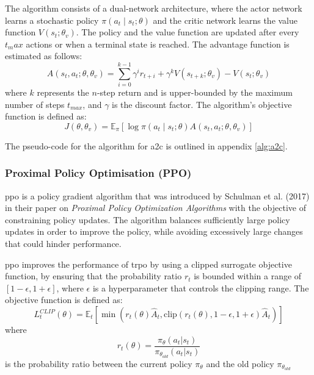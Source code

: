 The algorithm consists of a dual-network architecture, where the actor network learns a stochastic policy $\pi\left(a_t\mid s_t; \theta\right)$ and the critic network learns the value function $V\left(s_t; \theta_v\right)$. The policy and the value function are updated after every $t_max$ actions or when a terminal state is reached. The advantage function is estimated as follows: 
\begin{equation}
    A\left(s_t, a_t; \theta, \theta_v\right) = \sum_{i=0}^{k-1} \gamma^i r_{t+i} + \gamma^k V\left(s_{t+k}; \theta_v\right) - V\left(s_t; \theta_v\right)
\end{equation}
where $k$ represents the $n$-step return and is upper-bounded by the maximum number of steps $t_{max}$, and $\gamma$ is the discount factor. The algorithm's objective function is defined as:
\begin{equation}
    J\left(\theta, \theta_v\right) = \mathbb{E}_{\pi}\left[\log \pi\left(a_t\mid s_t; \theta\right) A\left(s_t, a_t; \theta, \theta_v\right)\right]
\end{equation}

The pseudo-code for the algorithm for \acrshort{a2c} is outlined in appendix \ref{alg:a2c}. 

\subsubsection{Proximal Policy Optimisation (PPO)} \label{sec:ppo}

\acrfull{ppo} is a policy gradient algorithm that was introduced by Schulman et al. (2017) in their paper on \textit{Proximal Policy Optimization Algorithms} \cite{Schulman2017} with the objective of constraining policy updates. The algorithm balances sufficiently large policy updates in order to improve the policy, while avoiding excessively large changes that could hinder performance. 

\acrshort{ppo} improves the performance of \acrfull{trpo} \cite{Schulman2015} by using a clipped surrogate objective function, by ensuring that the probability ratio $r_t$ is bounded within a range of $[1 - \epsilon, 1 + \epsilon]$, where $\epsilon$ is a hyperparameter that controls the clipping range. The objective function is defined as:
\begin{equation}
    L_t^{CLIP}(\theta) = \mathbb{E}_t \left[\min\left(r_t(\theta) \hat{A}_t, \text{clip}\left(r_t(\theta), 1 - \epsilon, 1 + \epsilon\right) \hat{A}_t\right)\right]
\end{equation}
where 
\begin{equation}
    r_t(\theta) = \frac{\pi_\theta(a_t | s_t)}{\pi_{\theta_{old}}(a_t | s_t)}
\end{equation}
is the probability ratio between the current policy $\pi_\theta$ and the old policy $\pi_{\theta_{old}}$

